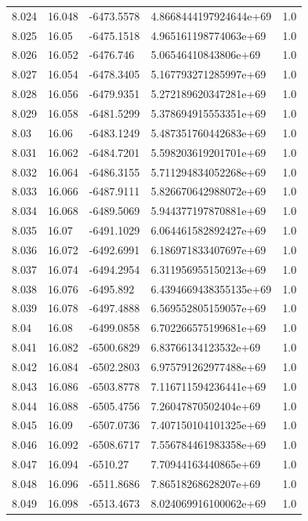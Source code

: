 \begin{tabular}{lllll}
8.024 & 16.048 & -6473.5578 & 4.8668444197924644e+69 & 1.0 \\
8.025 & 16.05 & -6475.1518 & 4.965161198774063e+69 & 1.0 \\
8.026 & 16.052 & -6476.746 & 5.06546410843806e+69 & 1.0 \\
8.027 & 16.054 & -6478.3405 & 5.167793271285997e+69 & 1.0 \\
8.028 & 16.056 & -6479.9351 & 5.272189620347281e+69 & 1.0 \\
8.029 & 16.058 & -6481.5299 & 5.378694915553351e+69 & 1.0 \\
8.03 & 16.06 & -6483.1249 & 5.487351760442683e+69 & 1.0 \\
8.031 & 16.062 & -6484.7201 & 5.598203619201701e+69 & 1.0 \\
8.032 & 16.064 & -6486.3155 & 5.711294834052268e+69 & 1.0 \\
8.033 & 16.066 & -6487.9111 & 5.826670642988072e+69 & 1.0 \\
8.034 & 16.068 & -6489.5069 & 5.944377197870881e+69 & 1.0 \\
8.035 & 16.07 & -6491.1029 & 6.064461582892427e+69 & 1.0 \\
8.036 & 16.072 & -6492.6991 & 6.186971833407697e+69 & 1.0 \\
8.037 & 16.074 & -6494.2954 & 6.311956955150213e+69 & 1.0 \\
8.038 & 16.076 & -6495.892 & 6.4394669438355135e+69 & 1.0 \\
8.039 & 16.078 & -6497.4888 & 6.569552805159057e+69 & 1.0 \\
8.04 & 16.08 & -6499.0858 & 6.702266575199681e+69 & 1.0 \\
8.041 & 16.082 & -6500.6829 & 6.83766134123532e+69 & 1.0 \\
8.042 & 16.084 & -6502.2803 & 6.975791262977488e+69 & 1.0 \\
8.043 & 16.086 & -6503.8778 & 7.116711594236441e+69 & 1.0 \\
8.044 & 16.088 & -6505.4756 & 7.26047870502404e+69 & 1.0 \\
8.045 & 16.09 & -6507.0736 & 7.407150104101325e+69 & 1.0 \\
8.046 & 16.092 & -6508.6717 & 7.556784461983358e+69 & 1.0 \\
8.047 & 16.094 & -6510.27 & 7.70944163440865e+69 & 1.0 \\
8.048 & 16.096 & -6511.8686 & 7.86518268628207e+69 & 1.0 \\
8.049 & 16.098 & -6513.4673 & 8.024069916100062e+69 & 1.0 \\

\end{tabular}
